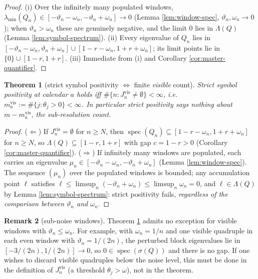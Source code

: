 \documentclass[11pt,reqno]{amsart}
\newtheorem{theorem}{Theorem}[section]
\theoremstyle{definition}
\newtheorem{remark}[theorem]{Remark}
\newcommand{\spec}{\operatorname{spec}}
\begin{document}
\begin{proof}
(i) Over the infinitely many populated windows,
\(\lambda_{\min}(Q_n)\in[-\vartheta_n-\omega_n,-\vartheta_n+\omega_n]\to0\)
(Lemma \ref{lem:window-spec}, \(\vartheta_n,\omega_n\to0\)); when
\(\vartheta_n>\omega_n\) these are genuinely negative, and the limit \(0\) lies
in \(\Lambda(Q)\) (Lemma \ref{lem:symbol-spectrum}). (ii) Every eigenvalue of
\(Q_n\) lies in
\([-\vartheta_n-\omega_n,\vartheta_n+\omega_n]\cup[1-r-\omega_n,1+r+\omega_n]\);
its limit points lie in \(\{0\}\cup[1-r,1+r]\). (iii) Immediate from (i) and
Corollary \ref{cor:master-quantifier}.
\end{proof}

\begin{theorem}[strict symbol positivity \(\iff\) finite \emph{visible} count]
\label{thm:strict}
Strict symbol positivity at calendar \(a\)
holds iff \(\#\{n:J_n^{\mathrm{vis}}\neq\emptyset\}<\infty\), i.e.\
\(m_a^{\mathrm{vis}}:=\#\{j:\theta_j>0\}<\infty\). In particular strict positivity says \emph{nothing} about
\(m-m_a^{\mathrm{vis}}\), the sub-resolution count.
\end{theorem}

\begin{proof}
(\(\Leftarrow\)) If \(J_n^{\mathrm{vis}}=\emptyset\) for \(n\geq N\),
then \(\spec(Q_n)\subseteq[1-r-\omega_n,1+r+\omega_n]\) for \(n\geq N\), so
\(\Lambda(Q)\subseteq[1-r,1+r]\) with gap \(c=1-r>0\) (Corollary
\ref{cor:master-quantifier}). (\(\Rightarrow\)) If infinitely many windows are
populated, each carries an eigenvalue
\(\mu_n\in[-\vartheta_n-\omega_n,-\vartheta_n+\omega_n]\) (Lemma
\ref{lem:window-spec}). The sequence \((\mu_n)\) over the populated windows is
bounded; any accumulation point \(\ell\) satisfies
\(\ell\leq\limsup_n(-\vartheta_n+\omega_n)\leq\limsup_n\omega_n=0\), and
\(\ell\in\Lambda(Q)\) by Lemma \ref{lem:symbol-spectrum}: strict positivity
fails, \emph{regardless of the comparison between \(\vartheta_n\) and
\(\omega_n\)}.
\end{proof}

\begin{remark}[sub-noise windows]\label{rem:strict-corrected}
Theorem \ref{thm:strict} admits no exception for visible windows with
\(\vartheta_n\leq\omega_n\). For example, with \(\omega_n=1/n\) and one visible
quadruple in each even window with \(\vartheta_n=1/(2n)\), the perturbed block
eigenvalues lie in \([-3/(2n),1/(2n)]\to0\), so \(0\in\spec(\sigma(Q))\) and
there is no gap. If one wishes to discard visible quadruples below the noise
level, this must be done in the definition of \(J_n^{\mathrm{vis}}\) (a
threshold \(\theta_j>\omega\)), not in the theorem.
\end{remark}
\end{document}
